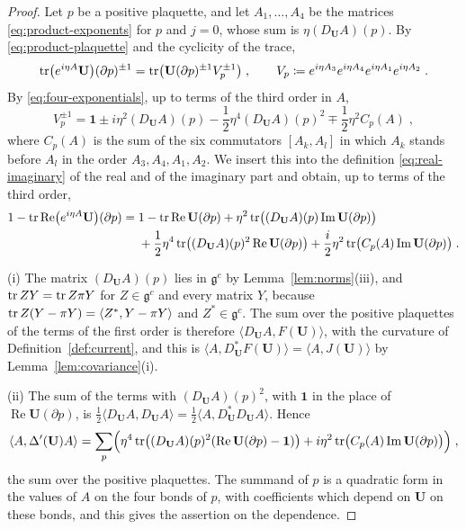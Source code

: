 \documentclass[11pt]{preprint}
\newcommand{\id}{\mathbf 1}
\newcommand{\re}{\operatorname{Re}}
\newcommand{\im}{\operatorname{Im}}
\numberwithin{equation}{section}
\begin{document}
\begin{proof}
Let $p$ be a positive plaquette, and let $A_1, \dots, A_4$ be the matrices \eqref{eq:product-exponents} for $p$ and $j = 0$, whose sum is $\eta(D_{\mathbf U}A)(p)$. By \eqref{eq:product-plaquette} and the cyclicity of the trace,
\[
    \operatorname{tr}\bigl(e^{i\eta A}\mathbf U\bigr)(\partial p)^{\pm1} = \operatorname{tr}\bigl(\mathbf U(\partial p)^{\pm1}V_p^{\pm1}\bigr)\;,
    \qquad
    V_p \coloneqq e^{i\eta A_3}e^{i\eta A_4}e^{i\eta A_1}e^{i\eta A_2}\;.
\]
By \eqref{eq:four-exponentials}, up to terms of the third order in $A$,
\[
    V_p^{\pm1} = \id \pm i\eta^2(D_{\mathbf U}A)(p) - \frac{1}{2}\eta^4(D_{\mathbf U}A)(p)^2 \mp \frac{1}{2}\eta^2C_p(A)\;,
\]
where $C_p(A)$ is the sum of the six commutators $[A_k, A_l]$ in which $A_k$ stands before $A_l$ in the order $A_3, A_4, A_1, A_2$. We insert this into the definition \eqref{eq:real-imaginary} of the real and of the imaginary part and obtain, up to terms of the third order,
\begin{align*}
    1 - \tr\re\bigl(e^{i\eta A}\mathbf U\bigr)(\partial p) ={}& 1 - \tr\re\mathbf U(\partial p) + \eta^2\tr\bigl((D_{\mathbf U}A)(p)\im\mathbf U(\partial p)\bigr)\\
    &+ \frac{1}{2}\eta^4\tr\bigl((D_{\mathbf U}A)(p)^2\re\mathbf U(\partial p)\bigr) + \frac{i}{2}\eta^2\tr\bigl(C_p(A)\im\mathbf U(\partial p)\bigr)\;.
\end{align*}

(i) The matrix $(D_{\mathbf U}A)(p)$ lies in $\mathfrak g^c$ by Lemma~\ref{lem:norms}(iii), and $\operatorname{tr} ZY = \operatorname{tr} Z\pi Y$ for $Z \in \mathfrak g^c$ and every matrix $Y$, because $\operatorname{tr} Z(Y - \pi Y) = \langle Z^*, Y - \pi Y\rangle$ and $Z^* \in \mathfrak g^c$. The sum over the positive plaquettes of the terms of the first order is therefore $\langle D_{\mathbf U}A, F(\mathbf U)\rangle$, with the curvature of Definition~\ref{def:current}, and this is $\langle A, D^*_{\mathbf U}F(\mathbf U)\rangle = \langle A, J(\mathbf U)\rangle$ by Lemma~\ref{lem:covariance}(i).

(ii) The sum of the terms with $(D_{\mathbf U}A)(p)^2$, with $\id$ in the place of $\re\mathbf U(\partial p)$, is $\frac{1}{2}\langle D_{\mathbf U}A, D_{\mathbf U}A\rangle = \frac{1}{2}\langle A, D^*_{\mathbf U}D_{\mathbf U}A\rangle$. Hence
\begin{equation}\label{eq:hessian-form}
    \langle A, \Delta'(\mathbf U)A\rangle = \sum_p\Bigl(\eta^4\tr\bigl((D_{\mathbf U}A)(p)^2(\re\mathbf U(\partial p) - \id)\bigr) + i\eta^2\tr\bigl(C_p(A)\im\mathbf U(\partial p)\bigr)\Bigr)\;,
\end{equation}
the sum over the positive plaquettes. The summand of $p$ is a quadratic form in the values of $A$ on the four bonds of $p$, with coefficients which depend on $\mathbf U$ on these bonds, and this gives the assertion on the dependence.


\end{proof}
\end{document}
